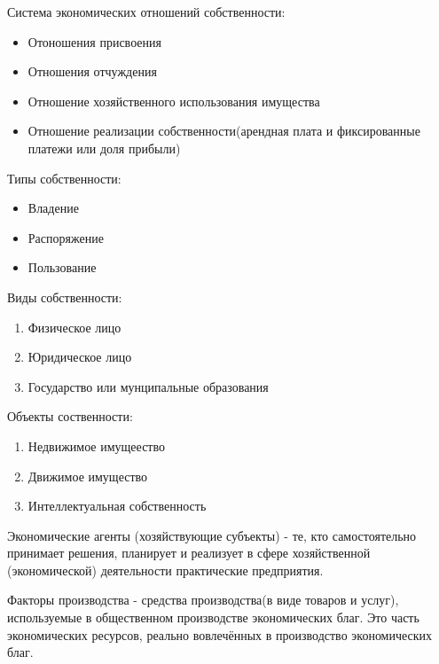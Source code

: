 \documentclass[a4paper, 12pt]{article}
\begin{document}
	Система экономических отношений собственности:
	\begin{itemize}
		\item Отоношения присвоения
		\item Отношения отчуждения
		\item Отношение хозяйственного использования имущества
		\item Отношение реализации собственности(арендная плата и фиксированные платежи или доля прибыли)
	\end{itemize}

	Типы собственности:
	\begin{itemize}
		\item Владение
		\item Распоряжение
		\item Пользование
	\end{itemize}

	Виды собственности:
	\begin{enumerate}
		\item Физическое лицо
		\item Юридическое лицо
		\item Государство или мунципальные образования
	\end{enumerate}

	Объекты соственности:
	\begin{enumerate}
		\item Недвижимое имущеество
		\item Движимое имущество
		\item Интеллектуальная собственность
	\end{enumerate}

	Экономические агенты (хозяйствующие субъекты) - те, кто самостоятельно принимает решения, планирует и реализует в сфере хозяйственной (экономической) деятельности практические предприятия.
	
	Факторы производства - средства производства(в виде товаров и услуг), используемые в общественном производстве экономических благ. Это часть экономических ресурсов, реально вовлечённых в производство экономических благ.
	
\end{document}
